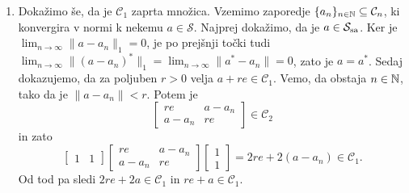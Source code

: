 \begin{dokaz}
\begin{enumerate}
        $$\begin{bmatrix}
            re & a\\
            a^* & re
        \end{bmatrix} \in \mathcal{C}_2$$
        natanko tedaj, ko je 
        \begin{align*}
            \begin{bmatrix}
                0 & 1\\
                1 & 0
            \end{bmatrix}  
            \begin{bmatrix}
                re & a\\
                a^* & re
            \end{bmatrix}
            \begin{bmatrix}
                0 & 1\\
                1 & 0
            \end{bmatrix}
            = \begin{bmatrix}
                re & a^*\\
                a & re
            \end{bmatrix} \in \mathcal{C}_2.
        \end{align*}
        Od tod sledi $\| a\|_1 = \| a^*\|_1$. 
        \item Dokažimo še, da je $\mathcal{C}_1$ zaprta množica.
        Vzemimo zaporedje $\{a_n\}_{n \in \mathbb N} \subseteq \mathcal{C}_n$, ki konvergira v normi k nekemu $a \in \mathcal{S}$.
        Najprej dokažimo, da je $a \in \mathcal{S}_{\operatorname{sa}}$. Ker je $\lim_{n \to \infty} \| a - a_n\|_1 = 0$,
        je po prejšnji točki tudi $\lim_{n \to \infty} \| (a - a_n)^*\|_1 = \lim_{n \to \infty} \| a^* - a_n\| = 0$,
        zato je $a = a^*$.
        Sedaj dokazujemo, da za poljuben $r > 0$ velja $a + re \in \mathcal{C}_1$.
        Vemo, da obstaja $n \in \mathbb N$, tako da je $\| a - a_n \| < r$.
        Potem je $$\begin{bmatrix}
            re & a - a_n\\
            a - a_n & re
        \end{bmatrix} \in \mathcal{C}_2$$
        in zato 
        $$\begin{bmatrix}
            1 & 1
        \end{bmatrix}\begin{bmatrix}
            re & a - a_n\\
            a - a_n & re
        \end{bmatrix} \begin{bmatrix}
            1 \\ 1
        \end{bmatrix} = 2 re + 2 (a - a_n) \in \mathcal{C}_1.$$
        Od tod pa sledi $2re + 2a \in \mathcal{C}_1$ in $re + a \in \mathcal{C}_1.$
        \qedhere
    \end{enumerate}
\end{dokaz}

